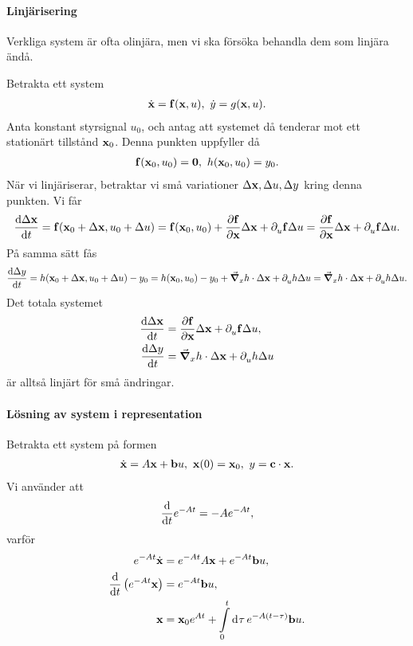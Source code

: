 \paragraph{Linjärisering}
Verkliga system är ofta olinjära, men vi ska försöka behandla dem som linjära ändå.

Betrakta ett system
\begin{align*}
	\dot{\vb{x}} = \vb{f}(\vb{x}, u),\ \dot{y} = g(\vb{x}, u).
\end{align*}
Anta konstant styrsignal $u_{0}$, och antag att systemet då tenderar mot ett stationärt tillstånd $\vb{x}_{0}$. Denna punkten uppfyller då
\begin{align*}
	\vb{f}(\vb{x}_{0}, u_{0}) = \vb{0},\ h(\vb{x}_{0}, u_{0}) = y_{0}.
\end{align*}
När vi linjäriserar, betraktar vi små variationer $\Delta\vb{x}, \Delta u, \Delta y$ kring denna punkten. Vi får
\begin{align*}
	\dv{\Delta\vb{x}}{t} = \vb{f}(\vb{x}_{0} + \Delta\vb{x}, u_{0} + \Delta u) = \vb{f}(\vb{x}_{0}, u_{0}) + \pdv{\vb{f}}{\vb{x}}\Delta\vb{x} + \partial_{u}^{}\vb{f}\Delta u = \pdv{\vb{f}}{\vb{x}}\Delta\vb{x} + \partial_{u}^{}\vb{f}\Delta u.
\end{align*}
På samma sätt fås
\begin{align*}
	\dv{\Delta y}{t} = h(\vb{x}_{0} + \Delta\vb{x}, u_{0} + \Delta u) - y_{0} = h(\vb{x}_{0}, u_{0}) - y_{0} + \grad_{x}{h}\cdot\Delta\vb{x} + \partial_{u}^{}h\Delta u = \grad_{x}{h}\cdot\Delta\vb{x} + \partial_{u}^{}h\Delta u.
\end{align*}
Det totala systemet
\begin{align*}
	\dv{\Delta\vb{x}}{t} &= \pdv{\vb{f}}{\vb{x}}\Delta\vb{x} + \partial_{u}^{}\vb{f}\Delta u, \\
	\dv{\Delta y}{t}     &= \grad_{x}{h}\cdot\Delta\vb{x} + \partial_{u}^{}h\Delta u
\end{align*}
är alltså linjärt för små ändringar.

\paragraph{Lösning av system i representation}
Betrakta ett system på formen
\begin{align*}
	\dot{\vb{x}} = A\vb{x} + \vb{b}u,\ \vb{x}(0) = \vb{x}_{0},\ y = \vb{c}\cdot\vb{x}.
\end{align*}
Vi använder att
\begin{align*}
	\dv{t}e^{-At} = -Ae^{-At},
\end{align*}
varför
\begin{align*}
	e^{-At}\dot{\vb{x}}              &= e^{-At}A\vb{x} + e^{-At}\vb{b}u, \\
	\dv{t}\left(e^{-At}\vb{x}\right) &= e^{-At}\vb{b}u, \\
	\vb{x}                           &= \vb{x}_{0}e^{At} + \int\limits_{0}^{t}\dd[]{\tau}e^{-A(t - \tau)}\vb{b}u.
\end{align*}

